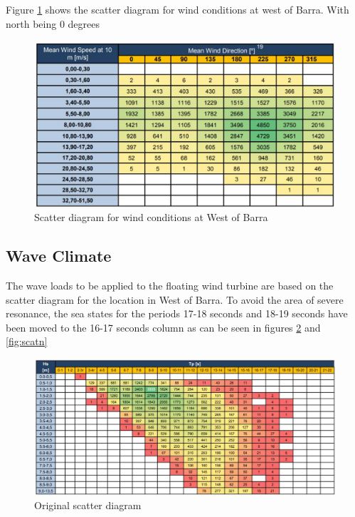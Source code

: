 \noindent Figure \ref{fig:scatterwind} shows the scatter diagram for wind conditions at west of Barra. With north being 0 degrees

\begin{figure}[H]
\centering
\includegraphics[scale=0.7]{figures/scatterwind}
\caption[$\; \:$Scatter diagram for wind conditions]{Scatter diagram for wind conditions at West of Barra \cite{Lifes50+D1.1} }
 \label{fig:scatterwind}
\end{figure}


\subsection{Wave Climate}
The wave loads to be applied to the floating wind turbine are based on the scatter diagram for the location in West of Barra. To avoid the area of severe resonance, the sea states for the periods 17-18 seconds and 18-19 seconds have been moved to the 16-17 seconds column as can be seen in figures \ref{fig:scato} and \ref{fig:scatn}

\begin{figure}[H]
\centering
\includegraphics[scale=0.5]{figures/scatteroriginal}
\caption[$\; \:$Original scatter diagram]{Original scatter diagram \cite{Lifes50+D1.1} }
 \label{fig:scato}
\end{figure}

